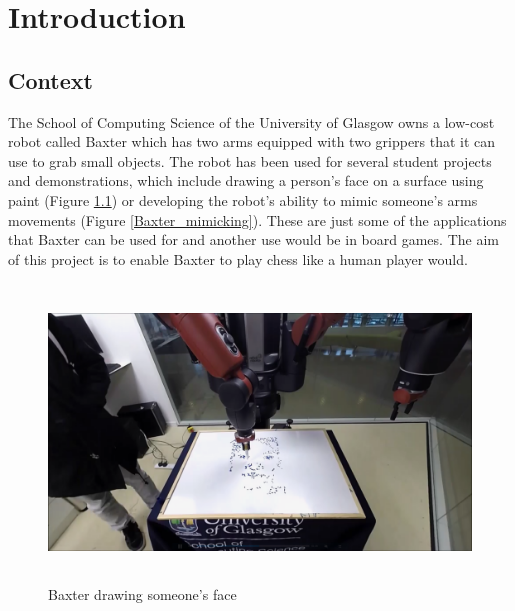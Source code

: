 \documentclass{l4proj}
\begin{document}
\tableofcontents
\listoffigures
\listoftables

\chapter{Introduction}


\section{Context}
The School of Computing Science of the University of Glasgow owns a low-cost robot called Baxter which has two arms equipped with two grippers that it can use to grab small objects. The robot has been used for several student projects and demonstrations, which include drawing a person's face on a surface using paint (Figure \ref{Baxter_drawing}) or developing the robot's ability to mimic someone's arms movements (Figure \ref{Baxter_mimicking}). These are just some of the applications that Baxter can be used for and another use would be in board games. The aim of this project is to enable Baxter to play chess like a human player would.


\vspace{10mm}
\begin{figure}[h!]
\centering
\includegraphics[height=7.87cm,width=14cm]{draw.png}
\caption{Baxter drawing someone's face \cite{Drawing}}
\label{Baxter_drawing}
\end{figure}
\end{document}
